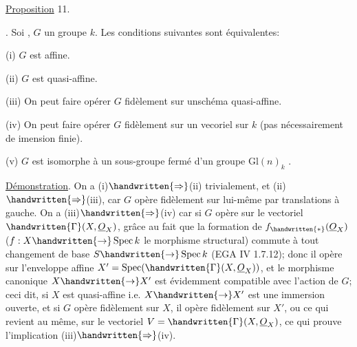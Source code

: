 \uline{Proposition} 11.. Soi , $G$ un groupe  $k$. Les conditions suivantes sont équivalentes:

(i) $G$ est affine.

(ii) $G$ est quasi-affine.

(iii) On peut faire opérer $G$ fidèlement sur unschéma quasi-affine.

(iv) On peut faire opérer $G$ fidèlement sur un vecoriel sur $k$ (pas nécessairement de imension finie).

(v)  $G$ est isomorphe à un sous-groupe fermé d'un groupe $\mathrm{Gl}(n)_k$ .

\uline{Démonstration}. On a (i)$\handwritten{\Rightarrow}$(ii) trivialement, et (ii)$\handwritten{\Rightarrow}$(iii), car $G$ opère fidèlement sur lui-même par translations à gauche. On a (iii)$\handwritten{\Rightarrow}$(iv) car si $G$ opère  sur le vectoriel $\handwritten{\Gamma}(X,\underline{O}_X)$, grâce au fait que la formation de $f_{\handwritten{*}}(\underline{O}_X)$ ($f:X\handwritten{\to}\operatorname{Spec}k$ le morphisme structural) commute à tout changement de base $S\handwritten{\to}\operatorname{Spec}k$ (EGA IV 1.7.12); donc il opère sur l'enveloppe affine $X'=\operatorname{Spec}(\handwritten{\Gamma}(X,\underline{O}_X))$, et le morphisme canonique $X\handwritten{\to}X'$ est évidemment compatible avec l'action de $G$; ceci dit, si $X$ est quasi-affine i.e. $X\handwritten{\to}X'$ est une immersion ouverte, et si $G$ opère fidèlement sur $X$, il opère fidèlement sur $X'$, ou ce qui revient au même, sur le vectoriel $V=\handwritten{\Gamma}(X,\underline{O}_X)$, ce qui prouve l'implication (iii)$\handwritten{\Rightarrow}$(iv).

